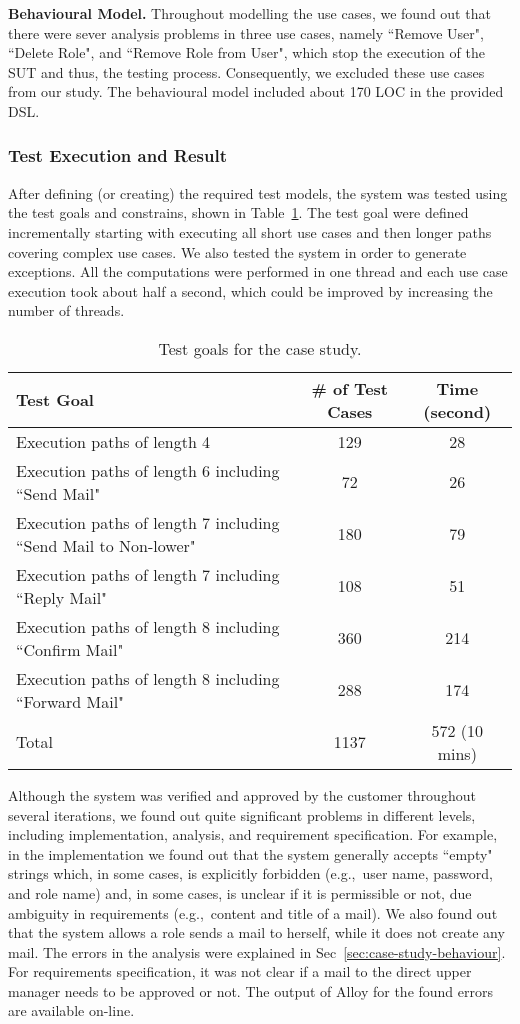 \textbf{Behavioural Model.} Throughout modelling the use cases, we found out that there were sever analysis problems in three use cases, namely ``Remove User", ``Delete Role", and ``Remove Role from User", which stop the execution of the SUT and thus, the testing process. Consequently, we excluded these use cases from our study. The behavioural model included about 170 LOC in the provided DSL.  

\subsubsection{Test Execution and Result}
\label{sec:case-study-result}
After defining (or creating) the required test models, the system was tested using the test goals and constrains, shown in Table~\ref{tbl:case-study-goals}. The test goal were defined incrementally starting with executing all short use cases and then longer paths covering complex use cases. We also tested the system in order to generate exceptions. All the computations were performed in one thread and each use case execution took about half a second, which could be improved by increasing the number of threads.	

\begin{table}[!t]
\caption{Test goals for the case study.}
\label{tbl:case-study-goals}
\centering
\begin{tabular}{|p{4cm}|c|c|}
\hline
Test Goal & \# of Test Cases & Time (second)  \\ \hline
Execution paths of length 4 & 129 & 28 \\  \hline
Execution paths of length 6 including ``Send Mail" & 72 & 26 \\ \hline
Execution paths of length 7 including ``Send Mail to Non-lower" & 180 & 79 \\ \hline
Execution paths of length 7 including ``Reply Mail" & 108 & 51 \\ \hline
Execution paths of length 8 including ``Confirm Mail" & 360 & 214 \\ \hline
Execution paths of length 8 including ``Forward Mail" & 288 & 174 \\ \hline\hline
Total & 1137 & 572 (10 mins) \\
\hline
\end{tabular}
\end{table}

Although the system was verified and approved by the customer throughout several iterations, we found out quite significant problems in different levels, including implementation, analysis, and requirement specification. For example, in the implementation we found out that the system generally accepts ``empty" strings  which, in some cases, is explicitly forbidden (e.g.,\ user name, password, and role name) and, in some cases, is unclear if it is permissible or not, due ambiguity in requirements (e.g.,\ content and title of a mail). We also found out that the system allows a role sends a mail to herself, while it does not create any mail. The errors in the analysis were explained in Sec~\ref{sec:case-study-behaviour}. For requirements specification, it was not clear if a mail to the direct upper manager needs to be approved or not.
The output of Alloy for the found errors are available on-line. 


